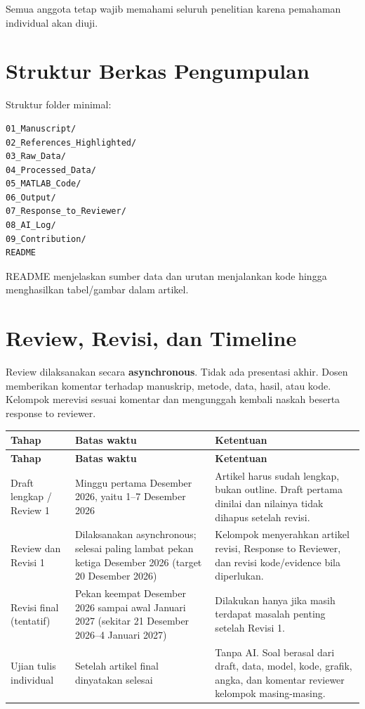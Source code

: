 \documentclass[11pt,a4paper]{article}
\begin{document}
Semua anggota tetap wajib memahami seluruh penelitian karena pemahaman individual akan diuji.

\section{Struktur Berkas Pengumpulan}

Struktur folder minimal:
\begin{verbatim}
01_Manuscript/
02_References_Highlighted/
03_Raw_Data/
04_Processed_Data/
05_MATLAB_Code/
06_Output/
07_Response_to_Reviewer/
08_AI_Log/
09_Contribution/
README
\end{verbatim}

README menjelaskan sumber data dan urutan menjalankan kode hingga menghasilkan tabel/gambar dalam artikel.

\section{Review, Revisi, dan Timeline}

Review dilaksanakan secara \textbf{asynchronous}. Tidak ada presentasi akhir. Dosen memberikan komentar terhadap manuskrip, metode, data, hasil, atau kode. Kelompok merevisi sesuai komentar dan mengunggah kembali naskah beserta response to reviewer.

\begin{longtable}{L{3.0cm} L{3.5cm} L{8.0cm}}
\toprule
\textbf{Tahap} & \textbf{Batas waktu} & \textbf{Ketentuan} \\
\midrule
\endfirsthead
\toprule
\textbf{Tahap} & \textbf{Batas waktu} & \textbf{Ketentuan} \\
\midrule
\endhead
Draft lengkap / Review 1 & Minggu pertama Desember 2026, yaitu 1--7 Desember 2026 & Artikel harus sudah lengkap, bukan outline. Draft pertama dinilai dan nilainya tidak dihapus setelah revisi. \\
Review dan Revisi 1 & Dilaksanakan asynchronous; selesai paling lambat pekan ketiga Desember 2026 (target 20 Desember 2026) & Kelompok menyerahkan artikel revisi, Response to Reviewer, dan revisi kode/evidence bila diperlukan. \\
Revisi final (tentatif) & Pekan keempat Desember 2026 sampai awal Januari 2027 (sekitar 21 Desember 2026--4 Januari 2027) & Dilakukan hanya jika masih terdapat masalah penting setelah Revisi 1. \\
Ujian tulis individual & Setelah artikel final dinyatakan selesai & Tanpa AI. Soal berasal dari draft, data, model, kode, grafik, angka, dan komentar reviewer kelompok masing-masing. \\
\bottomrule
\end{longtable}
\end{document}
